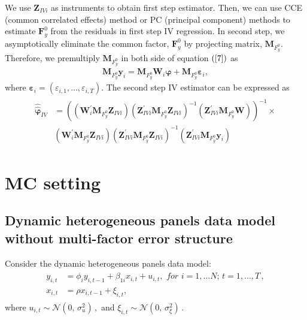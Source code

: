 \documentclass[12pt,a4paper,hyperref]{article}
\begin{document}
We use $\boldsymbol{Z}_{IVi}$ as instruments to obtain first step estimator. Then, we can use CCE (common correlated effects) method or PC (principal component) methods to estimate $\boldsymbol{F}^{0}_{y}$ from the residuals in first step IV regression. In second step, we asymptotically eliminate the common factor, $\boldsymbol{F}^{0}_{y}$ by projecting matrix, $\boldsymbol{M}_{F^{0}_{y}}$.
Therefore, we premultiply $\boldsymbol{M}_{F^{0}_{y}}$ in both side of equation $(\ref{7})$ as
\begin{align}
\boldsymbol{M}_{F^{0}_{y}}\boldsymbol{y}_{i}=\boldsymbol{M}_{F^{0}_{y}} \boldsymbol{W}_{i}\boldsymbol{\varphi}+\boldsymbol{M}_{F^{0}_{y}}\boldsymbol{\varepsilon}_{i},
\end{align}
 where $\boldsymbol{\varepsilon}_{i}=\left(\varepsilon_{i,1}, \ldots, \varepsilon_{i,T} \right)$.
The second step IV estimator can be expressed as
\begin{align}
\begin{split}
\boldsymbol{\hat{\hat{\varphi}}}_{IV}&=\left(    \left(\boldsymbol{W}^{'}_{i}\boldsymbol{M}_{F^{0}_{y}}\boldsymbol{Z}_{IVi} \right) \left( \boldsymbol{Z}^{'}_{IVi} \boldsymbol{M}_{F^{0}_{y}}\boldsymbol{Z}_{IVi}  \right)^{-1}    \left(  \boldsymbol{Z}^{'}_{IVi}  \boldsymbol{M}_{F^{0}_{y}} \boldsymbol{W} \right)\right)^{-1} \times \\
& \left(\boldsymbol{W}^{'}_{i}\boldsymbol{M}_{F^{0}_{y}}\boldsymbol{Z}_{IVi} \right) \left( \boldsymbol{Z}^{'}_{IVi} \boldsymbol{M}_{F^{0}_{y}}\boldsymbol{Z}_{IVi}  \right)^{-1}  \left(  \boldsymbol{Z}^{'}_{IVi}  \boldsymbol{M}_{F^{0}_{y}} \boldsymbol{y}_{i} \right)
\end{split}
\end{align}








\section{MC setting}
\subsection{Dynamic heterogeneous panels data model without multi-factor error structure }
Consider the dynamic heterogeneous panels data model:
\begin{align}
\begin{split}
y_{i,t}&=\phi_{i} y_{i,t-1}+ \beta_{1i}x_{i,t}+u_{i,t}, \,\, for\,\,i=1,\ldots N;\,t=1,\ldots,T\, , \\ \label{M1}
x_{i,t}&=\rho x_{i,t-1}+\xi_{i,t},
\end{split}
\end{align}
where $u_{i,t}\sim \mathcal{N}(0,\,\sigma_{u}^{2})\,,$ and $\xi_{i,t}\sim \mathcal{N}(0,\,\sigma_{\xi}^{2})\,.$
\end{document}
